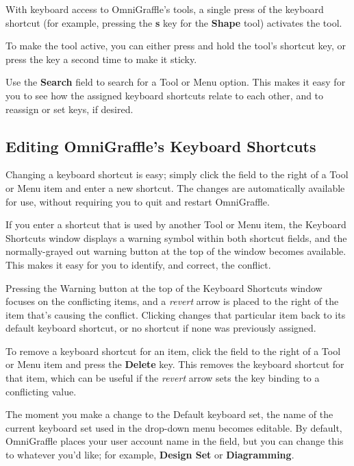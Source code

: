 \documentclass[../main.tex]{subfiles}
\begin{document}
\begin{ogtip}
  With keyboard access to OmniGraffle's tools, a single press of the keyboard shortcut (for
  example, pressing the \textbf{s} key for the \textbf{Shape} tool) activates the tool.

  To make the tool active, you can either press and hold the tool's shortcut key, or press the
  key a second time to make it sticky.
\end{ogtip}

Use the \textbf{Search} field to search for a Tool or Menu option. This makes it easy for you to
see how the assigned keyboard shortcuts relate to each other, and to reassign or set keys, if
desired.


\subsection{Editing OmniGraffle's Keyboard Shortcuts}

Changing a keyboard shortcut is easy; simply click the field to the right of a Tool or Menu item
and enter a new shortcut. The changes are automatically available for use, without requiring
you to quit and restart OmniGraffle.

If you enter a shortcut that is used by another Tool or Menu item, the Keyboard Shortcuts window
displays a warning symbol within both shortcut fields, and the normally-grayed out warning
button at the top of the window becomes available. This makes it easy for you to identify, and
correct, the conflict.


Pressing the Warning button at the top of the Keyboard Shortcuts window focuses on the
conflicting items, and a \textit{revert} arrow 
is placed to the right of the item that's causing the conflict. Clicking
 changes that particular item back to its default
keyboard shortcut, or no shortcut if none was previously assigned.

To remove a keyboard shortcut for an item, click the field to the right of a Tool or Menu item
and press the \textbf{Delete} key. This removes the keyboard shortcut for that item, which can
be useful if the \textit{revert} arrow sets the key binding to a conflicting value.

The moment you make a change to the Default keyboard set, the name of the current keyboard set
used in the drop-down menu becomes editable. By default, OmniGraffle places your user account
name in the field, but you can change this to whatever you'd like; for example, \textbf{Design
Set} or \textbf{Diagramming}.
\end{document}
